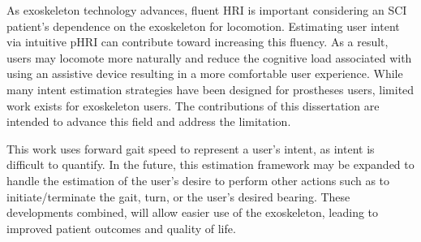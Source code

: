 As exoskeleton technology advances, fluent HRI is important considering an SCI patient's dependence on the exoskeleton for locomotion. Estimating user intent via intuitive pHRI can contribute toward increasing this fluency. As a result, users may locomote more naturally and reduce the cognitive load associated with using an assistive device resulting in a more comfortable user experience. While many intent estimation strategies have been designed for prostheses users, limited work exists for exoskeleton users. The contributions of this dissertation are intended to advance this field and address the limitation.

This work uses forward gait speed to represent a user's intent, as intent is difficult to quantify. In the future, this estimation framework may be expanded to handle the estimation of the user's desire to perform other actions such as to initiate/terminate the gait, turn, or the user's desired bearing. These developments combined, will allow easier use of the exoskeleton, leading to improved patient outcomes and quality of life.